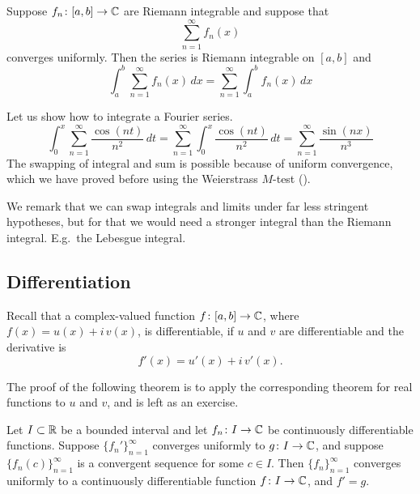 \begin{cor}
\pagebreak[2]
Suppose $f_n \colon [a,b] \to {\mathbb{C}}$
are Riemann integrable and suppose that
\begin{equation*}
\sum_{n=1}^\infty f_n(x)
\end{equation*}
converges uniformly.  Then the series is Riemann integrable on $[a,b]$
and
\begin{equation*}
\int_a^b \sum_{n=1}^\infty f_n(x) \,dx
=
\sum_{n=1}^\infty \int_a^b f_n(x) \,dx
\end{equation*}
\end{cor}

\begin{example}
Let us show how to integrate a Fourier series.
\begin{equation*}
\int_{0}^x \sum_{n=1}^\infty \frac{\cos(nt)}{n^2} \,dt
=
\sum_{n=1}^\infty \int_{0}^x \frac{\cos(nt)}{n^2}\,dt
=
\sum_{n=1}^\infty \frac{\sin(nx)}{n^3}
\end{equation*}
The swapping of integral and sum is possible because of uniform convergence,
which we have proved before using the Weierstrass $M$-test
().
\end{example}

We remark that we can swap integrals and limits under far less stringent hypotheses,
but for that we would need a stronger integral than the Riemann integral.
E.g.\ the Lebesgue integral.

\subsection{Differentiation}

Recall that a complex-valued function
$f \colon [a,b] \to {\mathbb{C}}$, where $f(x) = u(x)+i\,v(x)$,
is differentiable, if $u$ and $v$ are differentiable
and the derivative is
\begin{equation*}
f'(x) = u'(x)+i\,v'(x) .
\end{equation*}

The proof of the following theorem is to apply the corresponding theorem for
real functions to $u$ and $v$, and is left as an exercise.

\begin{thm} \label{thm:dersconvergecomplex}
Let $I \subset {\mathbb{R}}$ be a bounded interval and let
$f_n \colon I \to {\mathbb{C}}$ be continuously differentiable functions.
Suppose $\{ f_n' \}_{n=1}^\infty$ converges uniformly to $g \colon I \to {\mathbb{C}}$,
and suppose $\{ f_n(c) \}_{n=1}^\infty$ is a
convergent sequence for some $c \in I$.  Then $\{ f_n \}_{n=1}^\infty$ converges uniformly to 
a continuously differentiable function $f \colon I \to {\mathbb{C}}$, and $f' = g$.
\end{thm}


